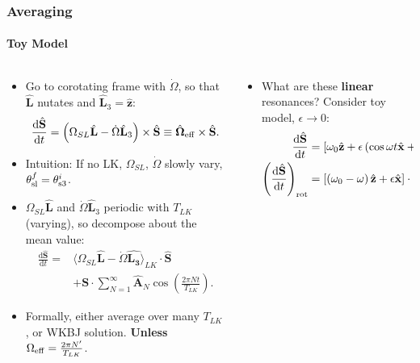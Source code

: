 \documentclass[dvipsnames, 8pt]{beamer}
\newcommand*{\rd}[2]{\frac{\mathrm{d}#1}{\mathrm{d}#2}}
\newcommand*{\bm}[1]{\boldsymbol{\mathbf{#1}}}
\newcommand*{\uv}[1]{\hat{\bm{#1}}}
\newcommand*{\ev}[1]{\langle#1\rangle}
\newcommand*{\p}[1]{\left(#1\right)}
\newcommand*{\s}[1]{\left[#1\right]}
\begin{document}
\begin{frame}
    \frametitle{Averaging}
    \framesubtitle{Toy Model}

    \begin{columns}
        \begin{column}{0.5\textwidth}
            \begin{itemize}
                \item Go to corotating frame with $\dot{\Omega}$, so that
                    $\uv{L}$ nutates and $\uv{L}_3 = \uv{z}$:
                    \begin{equation}
                        \rd{\uv{S}}{t} = \p{\Omega_{SL} \uv{L}
                            - \dot{\Omega} \uv{L}_3} \times \uv{S}
                            \equiv \uv{\Omega}_{\rm eff} \times \uv{S}.
                    \end{equation}

                \item Intuition: If no LK, $\Omega_{SL}$, $\dot{\Omega}$ slowly
                    vary, $\theta_{\rm sl}^f = \theta_{\rm s3}^i$.

                \item $\Omega_{SL}\uv{L}$ and $\dot{\Omega}\uv{L}_3$ periodic
                    with $T_{LK}$ (varying), so decompose about the mean value:
                    \begin{align}
                        \rd{\uv{S}}{t} ={}&
                            \ev{\Omega_{SL}\uv{L} - \dot{\Omega} \uv{L_3}}_{LK}
                                \cdot \uv{S}\nonumber\\
                            &+\bm{S} \cdot \sum\limits_{N = 1}^\infty \uv{A}_N
                                \cos \p{\frac{2\pi N t}{T_{LK}}}.
                    \end{align}

                \item Formally, either average over many $T_{LK}$, or WKBJ
                    solution. \textbf{Unless} $\Omega_{\rm eff} = \frac{2\pi
                    N'}{T_{LK}}$.
            \end{itemize}
        \end{column}
        \begin{column}{0.5\textwidth}
            \begin{itemize}
                \item What are these \textbf{linear} resonances? Consider toy
                    model, $\epsilon \to 0$:
                    \begin{align}
                        \rd{\uv{S}}{t} &= \s{\omega_0 \uv{z}
                            + \epsilon\p{\cos \omega t \uv{x} + \sin
                            \omega t \uv{y}}} \cdot \uv{S},\\
                        \p{\rd{\uv{S}}{t}}_{\rm rot} &=
                            \s{\p{\omega_0 - \omega}\uv{z} + \epsilon
                                \uv{x}} \cdot \uv{S}.
                    \end{align}


\end{itemize}
\end{column}
\end{columns}
\end{frame}
\end{document}
